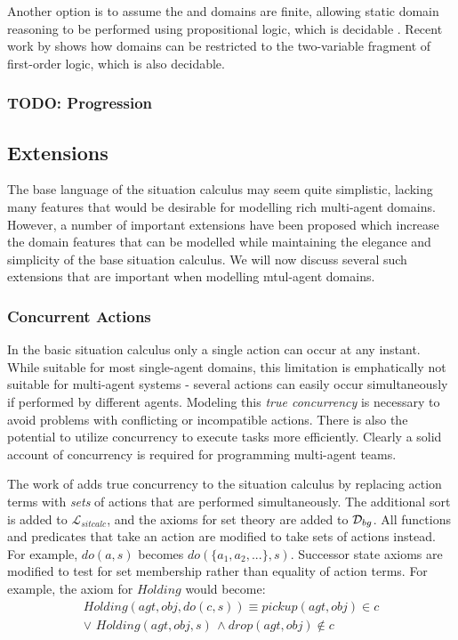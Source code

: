 Another option is to assume the  and  domains
are finite, allowing static domain reasoning to be performed using
propositional logic, which is decidable \citep{giacomo99impl_robots,levesque04krr_book}.
Recent work by \citet{yu07twovar_sitcalc} shows how domains can be
restricted to the two-variable fragment of first-order logic, which
is also decidable.\\



\subsubsection{TODO: Progression}


\subsection{Extensions}

The base language of the situation calculus may seem quite simplistic,
lacking many features that would be desirable for modelling rich multi-agent
domains. However, a number of important extensions have been proposed
which increase the domain features that can be modelled while maintaining
the elegance and simplicity of the base situation calculus. We will
now discuss several such extensions that are important when modelling
mtul-agent domains.


\subsubsection{Concurrent Actions}

In the basic situation calculus only a single action can occur at
any instant. While suitable for most single-agent domains, this limitation
is emphatically not suitable for multi-agent systems - several actions
can easily occur simultaneously if performed by different agents.
Modeling this \emph{true concurrency} is necessary to avoid problems
with conflicting or incompatible actions. There is also the potential
to utilize concurrency to execute tasks more efficiently. Clearly
a solid account of concurrency is required for programming multi-agent
teams.

The work of \citep{lin92sc_conc,reiter96sc_nat_conc} adds true concurrency
to the situation calculus by replacing action terms with \emph{sets}
of actions that are performed simultaneously. The additional sort
 is added to $\mathcal{L}_{sitcalc}$, and the axioms
for set theory are added to $\mathcal{D}_{bg}$. All functions and predicates
that take an action are modified to take sets of actions instead.
For example, $do(a,s)$ becomes $do(\{a_{1},a_{2},...\},s)$. Successor
state axioms are modified to test for set membership rather than equality
of action terms. For example, the axiom for $Holding$ would become:\begin{multline*}
Holding(agt,obj,do(c,s))\equiv pickup(agt,obj)\in c\\
\vee\,\, Holding(agt,obj,s)\,\wedge drop(agt,obj)\not\in c\end{multline*}


